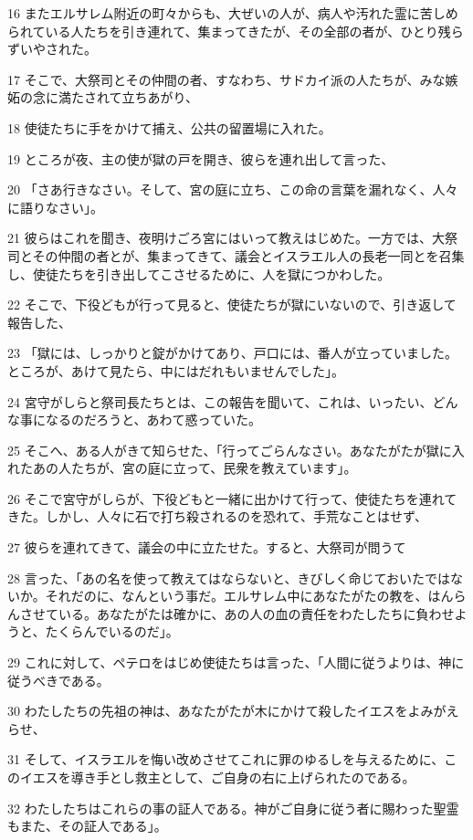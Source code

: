 \par 16 またエルサレム附近の町々からも、大ぜいの人が、病人や汚れた霊に苦しめられている人たちを引き連れて、集まってきたが、その全部の者が、ひとり残らずいやされた。
\par 17 そこで、大祭司とその仲間の者、すなわち、サドカイ派の人たちが、みな嫉妬の念に満たされて立ちあがり、
\par 18 使徒たちに手をかけて捕え、公共の留置場に入れた。
\par 19 ところが夜、主の使が獄の戸を開き、彼らを連れ出して言った、
\par 20 「さあ行きなさい。そして、宮の庭に立ち、この命の言葉を漏れなく、人々に語りなさい」。
\par 21 彼らはこれを聞き、夜明けごろ宮にはいって教えはじめた。一方では、大祭司とその仲間の者とが、集まってきて、議会とイスラエル人の長老一同とを召集し、使徒たちを引き出してこさせるために、人を獄につかわした。
\par 22 そこで、下役どもが行って見ると、使徒たちが獄にいないので、引き返して報告した、
\par 23 「獄には、しっかりと錠がかけてあり、戸口には、番人が立っていました。ところが、あけて見たら、中にはだれもいませんでした」。
\par 24 宮守がしらと祭司長たちとは、この報告を聞いて、これは、いったい、どんな事になるのだろうと、あわて惑っていた。
\par 25 そこへ、ある人がきて知らせた、「行ってごらんなさい。あなたがたが獄に入れたあの人たちが、宮の庭に立って、民衆を教えています」。
\par 26 そこで宮守がしらが、下役どもと一緒に出かけて行って、使徒たちを連れてきた。しかし、人々に石で打ち殺されるのを恐れて、手荒なことはせず、
\par 27 彼らを連れてきて、議会の中に立たせた。すると、大祭司が問うて
\par 28 言った、「あの名を使って教えてはならないと、きびしく命じておいたではないか。それだのに、なんという事だ。エルサレム中にあなたがたの教を、はんらんさせている。あなたがたは確かに、あの人の血の責任をわたしたちに負わせようと、たくらんでいるのだ」。
\par 29 これに対して、ペテロをはじめ使徒たちは言った、「人間に従うよりは、神に従うべきである。
\par 30 わたしたちの先祖の神は、あなたがたが木にかけて殺したイエスをよみがえらせ、
\par 31 そして、イスラエルを悔い改めさせてこれに罪のゆるしを与えるために、このイエスを導き手とし救主として、ご自身の右に上げられたのである。
\par 32 わたしたちはこれらの事の証人である。神がご自身に従う者に賜わった聖霊もまた、その証人である」。
